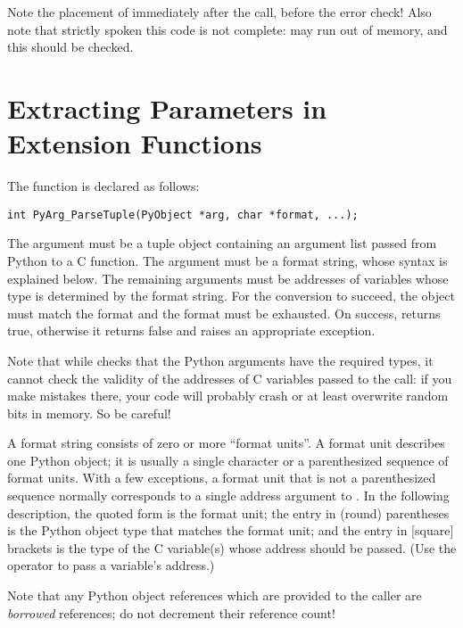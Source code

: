 Note the placement of  immediately after the
call, before the error check!  Also note that strictly spoken this
code is not complete:  may run out of
memory, and this should be checked.


\section{Extracting Parameters in Extension Functions
         \label{parseTuple}}

The  function is declared as follows:

\begin{verbatim}
int PyArg_ParseTuple(PyObject *arg, char *format, ...);
\end{verbatim}

The  argument must be a tuple object containing an argument
list passed from Python to a C function.  The  argument
must be a format string, whose syntax is explained below.  The
remaining arguments must be addresses of variables whose type is
determined by the format string.  For the conversion to succeed, the
 object must match the format and the format must be
exhausted.  On success,  returns true,
otherwise it returns false and raises an appropriate exception.

Note that while  checks that the Python
arguments have the required types, it cannot check the validity of the
addresses of C variables passed to the call: if you make mistakes
there, your code will probably crash or at least overwrite random bits
in memory.  So be careful!

A format string consists of zero or more ``format units''.  A format
unit describes one Python object; it is usually a single character or
a parenthesized sequence of format units.  With a few exceptions, a
format unit that is not a parenthesized sequence normally corresponds
to a single address argument to .  In the
following description, the quoted form is the format unit; the entry
in (round) parentheses is the Python object type that matches the
format unit; and the entry in [square] brackets is the type of the C
variable(s) whose address should be passed.  (Use the \samp{\&}
operator to pass a variable's address.)

Note that any Python object references which are provided to the
caller are \emph{borrowed} references; do not decrement their
reference count!

